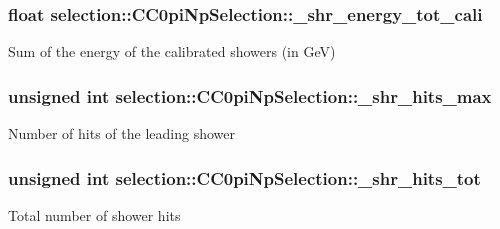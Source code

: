 \subsubsection[{\texorpdfstring{\+\_\+shr\+\_\+energy\+\_\+tot\+\_\+cali}{_shr_energy_tot_cali}}]{\setlength{\rightskip}{0pt plus 5cm}float selection\+::\+C\+C0pi\+Np\+Selection\+::\+\_\+shr\+\_\+energy\+\_\+tot\+\_\+cali\hspace{0.3cm}{\ttfamily [private]}}\hypertarget{classselection_1_1CC0piNpSelection_aae69f88600d31bb3456808268fb63c1c}{}\label{classselection_1_1CC0piNpSelection_aae69f88600d31bb3456808268fb63c1c}
Sum of the energy of the calibrated showers (in GeV) 
\subsubsection[{\texorpdfstring{\+\_\+shr\+\_\+hits\+\_\+max}{_shr_hits_max}}]{\setlength{\rightskip}{0pt plus 5cm}unsigned int selection\+::\+C\+C0pi\+Np\+Selection\+::\+\_\+shr\+\_\+hits\+\_\+max\hspace{0.3cm}{\ttfamily [private]}}\hypertarget{classselection_1_1CC0piNpSelection_a750834ef52299d85f9596bbbafa1dffb}{}\label{classselection_1_1CC0piNpSelection_a750834ef52299d85f9596bbbafa1dffb}
Number of hits of the leading shower 
\subsubsection[{\texorpdfstring{\+\_\+shr\+\_\+hits\+\_\+tot}{_shr_hits_tot}}]{\setlength{\rightskip}{0pt plus 5cm}unsigned int selection\+::\+C\+C0pi\+Np\+Selection\+::\+\_\+shr\+\_\+hits\+\_\+tot\hspace{0.3cm}{\ttfamily [private]}}\hypertarget{classselection_1_1CC0piNpSelection_aa6e7162371e3e343df001f0afc8a20b8}{}\label{classselection_1_1CC0piNpSelection_aa6e7162371e3e343df001f0afc8a20b8}
Total number of shower hits 
